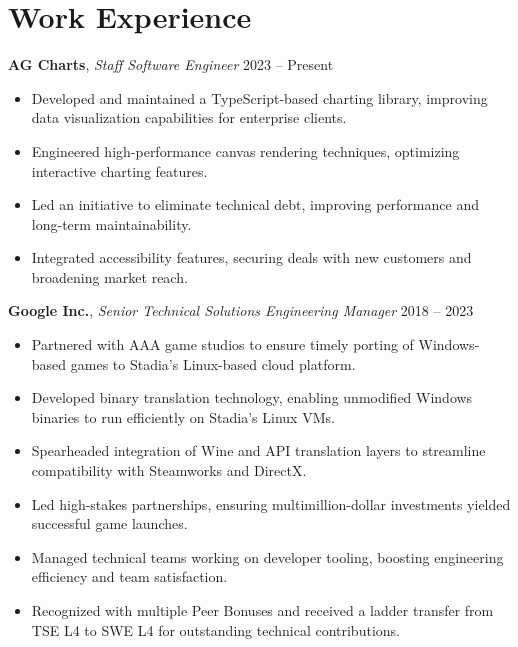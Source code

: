 \documentclass[a4paper,10pt]{article}
\begin{document}
{\begin{minipage}[t]{0.72\textwidth}
    \section*{\color{navy} Work Experience}

    \textbf{AG Charts}, \textit{Staff Software Engineer} \hfill 2023 -- Present
    \begin{itemize}[leftmargin=1.5em, nosep]
        \item Developed and maintained a TypeScript-based charting library, improving data visualization capabilities for enterprise clients.
        \item Engineered high-performance canvas rendering techniques, optimizing interactive charting features.
        \item Led an initiative to eliminate technical debt, improving performance and long-term maintainability.
        \item Integrated accessibility features, securing deals with new customers and broadening market reach.
    \end{itemize}
    \vspace{0.5em}

    \textbf{Google Inc.}, \textit{Senior Technical Solutions Engineering Manager} \hfill 2018 -- 2023
    \begin{itemize}[leftmargin=1.5em, nosep]
        \item Partnered with AAA game studios to ensure timely porting of Windows-based games to Stadia’s Linux-based cloud platform.
        \item Developed binary translation technology, enabling unmodified Windows binaries to run efficiently on Stadia’s Linux VMs.
        \item Spearheaded integration of Wine and API translation layers to streamline compatibility with Steamworks and DirectX.
        \item Led high-stakes partnerships, ensuring multimillion-dollar investments yielded successful game launches.
        \item Managed technical teams working on developer tooling, boosting engineering efficiency and team satisfaction.
        \item Recognized with multiple Peer Bonuses and received a ladder transfer from TSE L4 to SWE L4 for outstanding technical contributions.
    \end{itemize}

    \vspace{0.5em}


\end{minipage}}
\end{document}
